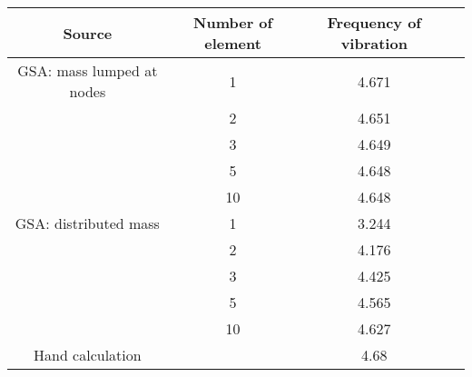 \begin{center}\begin{tabular}{|c|c|c|c|}
\hline
Source & Number of element & Frequency of vibration \\
\hline
GSA: mass lumped at nodes &     1 & 4.671 \\
      &     2 & 4.651 \\
      &     3 & 4.649 \\
      &     5 & 4.648 \\
      &    10 & 4.648 \\
\hline
GSA: distributed mass &     1 & 3.244 \\
      &     2 & 4.176 \\
      &     3 & 4.425 \\
      &     5 & 4.565 \\
      &    10 & 4.627 \\
\hline
Hand calculation & & 4.68\\\hline
\end{tabular}\end{center}